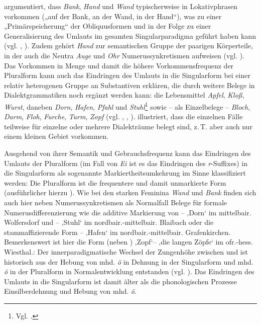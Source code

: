 \citet[190]{Rowley1997} argumentiert, dass \textit{Bank}, \textit{Hand} und \textit{Wand} typischerweise in Lokativphrasen vorkommen („auf der Bank, an der Wand, in der Hand“), was zu einer „Primärspeicherung“ der Obliquusformen und in der Folge zu einer Generalisierung des Umlauts im gesamten Singularparadigma geführt haben kann (vgl. \citealt[54]{Roth1940}, \citealt[843]{Tiersma1982}). Zudem gehört \textit{Hand} zur semantischen Gruppe der paarigen Körperteile, in der auch die Neutra \textit{Auge} und \textit{Ohr} Numerussynkretismen aufweisen (vgl. ). Das Vorkommen in Menge und damit die höhere Vorkommensfrequenz der Pluralform kann auch das Eindringen des Umlauts in die Singularform bei einer relativ heterogenen Gruppe an Substantiven erklären, die durch weitere Belege in Dialektgrammatiken noch ergänzt werden kann: die Lebensmittel \textit{Apfel}, \textit{Kloß}, \textit{Wurst}, daneben \textit{Dorn}, \textit{Hafen}, \textit{Pfahl} und \textit{Stuhl}\footnote{Vgl. \citet[Karte 99]{Brendel1962}.} sowie -- als Einzelbelege -- \textit{Bloch}, \textit{Darm}, \textit{Floh}, \textit{Furche}, \textit{Turm}, \textit{Zopf} (vgl. \citealt[189]{Rowley1997}, \citealt[324--325]{Schiepek1908}, \citealt[442--443]{Schirmunski1962}).  illustriert, dass die einzelnen Fälle teilweise für einzelne oder mehrere Dialekträume belegt sind, z.\,T. aber auch nur einem kleinen Gebiet vorkommen.

Ausgehend von ihrer Semantik und Gebrauchsfrequenz kann das Eindringen des Umlauts der Pluralform (im Fall von \textit{Ei} ist es das Eindringen des \textit{r}-Suffixes) in die Singularform als sogenannte Markiertheitsumkehrung im Sinne  klassifiziert werden: Die Pluralform ist die frequentere und damit unmarkierte Form (ausführlicher hierzu \citealt{Bybee2010}). Wie bei den starken Feminina \textit{Wand} und \textit{Bank} finden sich auch hier neben Numerussynkretismen als Normalfall Belege für formale Numerusdifferenzierung wie die additive Markierung von  --  ‚Dorn‘ im mittelbair. Wolfersdorf und 
 --  ‚Stuhl‘ im nordbair.-mittelbair. Blaibach oder die stammaffizierende Form  --  ‚Hafen‘ im nordbair.-mittelbair. Grafenkirchen. Bemerkenswert ist hier die Form  (neben ) ‚Zopf‘--    ‚die langen Zöpfe‘ im ofr.-hess. Wiesthal.: Der innerparadigmatische Wechsel der Zungenhöhe zwischen  und  ist historisch aus der Hebung von mhd. \textit{ö} in Dehnung in der Singularform und mhd. \textit{ö} in der Pluralform in Normalentwicklung entstanden (vgl. ). Das Eindringen des Umlauts in die Singularform ist damit älter als die phonologischen Prozesse Einsilberdehnung und Hebung von mhd. \textit{ö}.

